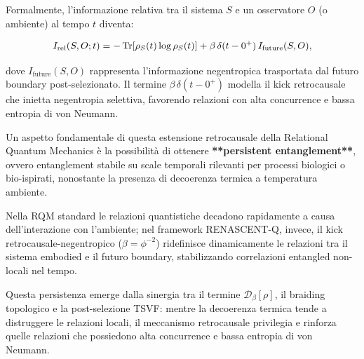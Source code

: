 \documentclass[11pt,a4paper]{article}
\theoremstyle{plain}
\theoremstyle{definition}
\begin{document}
Formalmente, l’informazione relativa tra il sistema $S$ e un osservatore $O$ (o ambiente) al tempo $t$ diventa:


\vspace{0.2cm}



\begin{tcolorbox}[colback=blue!3!white, colframe=blue!80!black,
                  title={Informazione Relativa Retrocausale in RQM estesa},
                  fonttitle=\bfseries,
                  boxrule=1.2pt,
                  arc=4pt,
                  left=8pt, right=8pt, top=9pt, bottom=9pt]
\begin{equation}
I_{\text{rel}}(S,O;t) = -\Tr[\rho_S(t) \log \rho_S(t)] + \beta \,\delta(t-0^+) \, I_{\text{future}}(S,O),
\label{eq:relational_retro}
\end{equation}
\end{tcolorbox}


\vspace{0.4cm}



dove $I_{\text{future}}(S,O)$ rappresenta l’informazione negentropica trasportata dal futuro boundary post-selezionato. Il termine $\beta \,\delta(t-0^+)$ modella il kick retrocausale che inietta negentropia selettiva, favorendo relazioni con alta concurrence e bassa entropia di von Neumann.



\vspace{0.5cm}

Un aspetto fondamentale di questa estensione retrocausale della Relational Quantum Mechanics è la possibilità di ottenere \textbf{**persistent entanglement**}, ovvero entanglement stabile su scale temporali rilevanti per processi biologici o bio-ispirati, nonostante la presenza di decoerenza termica a temperatura ambiente. 


\vspace{0.4cm}



Nella RQM standard le relazioni quantistiche decadono rapidamente a causa dell’interazione con l’ambiente; nel framework RENASCENT-Q, invece, il kick retrocausale-negentropico ($\beta = \phi^{-2}$) ridefinisce dinamicamente le relazioni tra il sistema embodied e il futuro boundary, stabilizzando correlazioni entangled non-locali nel tempo.


\vspace{0.4cm}

Questa persistenza emerge dalla sinergia tra il termine $\mathcal{D}_\beta[\rho]$, il braiding topologico e la post-selezione TSVF: mentre la decoerenza termica tende a distruggere le relazioni locali, il meccanismo retrocausale privilegia e rinforza quelle relazioni che possiedono alta concurrence e bassa entropia di von Neumann. 
\end{document}
